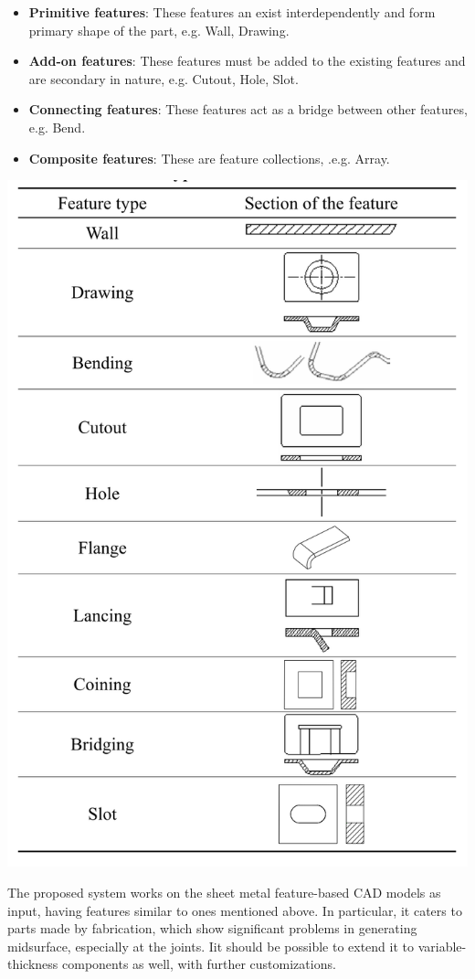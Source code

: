 \begin{minipage}[c]{0.98\linewidth}
\begin{minipage}[t]{0.48\linewidth}
\begin{itemize}[noitemsep,topsep=2pt,parsep=2pt,partopsep=2pt]
\item \textbf{Primitive features}: These features an exist interdependently and form primary shape of the part, e.g. Wall, Drawing.
\item \textbf{Add-on features}: These features must be added to the existing features and are secondary in nature, e.g. Cutout, Hole, Slot.
\item \textbf{Connecting features}: These features act as a bridge between other features, e.g. Bend.
\item \textbf{Composite features}: These are feature collections, .e.g. Array.
\end{itemize}
\end{minipage}
\hfill
\begin{minipage}[t]{0.48\linewidth}
\includegraphics[width=0.52\linewidth,valign=t]{..//Common/images/liuFeatures}
\label{fig:liufeatures}
\end{minipage}
\end{minipage}

The proposed system works on the sheet metal feature-based CAD models as input, having features similar to ones mentioned above. In particular, it caters to parts made by fabrication, which show significant problems in generating midsurface, especially at the joints. Iit should be possible to extend it to variable-thickness components as well, with further customizations. 

